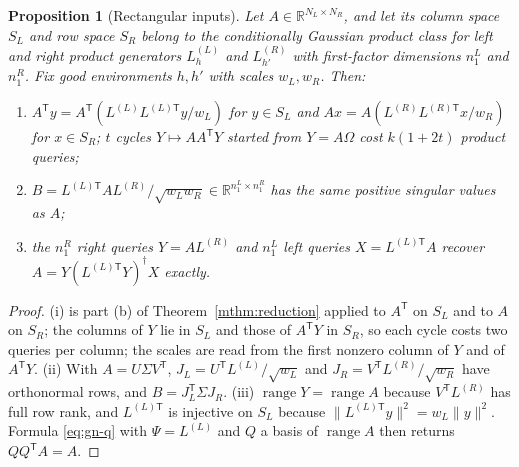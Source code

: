 \documentclass[11pt,a4paper]{article}
\newtheorem{proposition}[theorem]{Proposition}
\theoremstyle{definition}
\theoremstyle{remark}
\numberwithin{equation}{section}
\newcommand{\R}{\mathbb R}
\newcommand{\T}{{\mathsf T}}
\newcommand{\range}{\operatorname{range}}
\newcommand{\norm}[1]{\lVert#1\rVert}
\begin{document}
\begin{proposition}[Rectangular inputs]\label{prop:rect}
Let $A\in\R^{N_L\times N_R}$, and let its column space $S_L$ and row space
$S_R$ belong to the conditionally Gaussian product class for left and right
product generators $L^{(L)}_{h}$ and $L^{(R)}_{h'}$ with first-factor dimensions
$n_1^L$ and $n_1^R$. Fix good environments $h,h'$ with scales $w_L,w_R$. Then:
\begin{enumerate}[label=\textup{(\roman*)}]
\item $A^\T y=A^\T(L^{(L)}L^{(L)\T}y/w_L)$ for $y\in S_L$ and
      $Ax=A(L^{(R)}L^{(R)\T}x/w_R)$ for $x\in S_R$; $t$ cycles
      $Y\mapsto AA^\T Y$ started from $Y=A\Omega$ cost $k(1+2t)$ product queries;
\item $B=L^{(L)\T}AL^{(R)}/\sqrt{w_Lw_R}\in\R^{n_1^L\times n_1^R}$ has the same
      positive singular values as $A$;
\item the $n_1^R$ right queries $Y=AL^{(R)}$ and $n_1^L$ left queries
      $X=L^{(L)\T}A$ recover $A=Y(L^{(L)\T}Y)^\dagger X$ exactly.
\end{enumerate}
\end{proposition}

\begin{proof}
(i) is part (b) of Theorem~\ref{mthm:reduction} applied to $A^\T$ on $S_L$ and
to $A$ on $S_R$; the columns of $Y$ lie in $S_L$ and those of $A^\T Y$ in $S_R$,
so each cycle costs two queries per column; the scales are read from the
first nonzero column of $Y$ and of $A^\T Y$. (ii) With $A=U\Sigma V^\T$,
$J_L=U^\T L^{(L)}/\sqrt{w_L}$ and $J_R=V^\T L^{(R)}/\sqrt{w_R}$ have orthonormal
rows, and $B=J_L^\T\Sigma J_R$. (iii) $\range Y=\range A$ because
$V^\T L^{(R)}$ has full row rank, and $L^{(L)\T}$ is injective on $S_L$ because
$\norm{L^{(L)\T}y}^2=w_L\norm y^2$. Formula \eqref{eq:gn-q} with $\Psi=L^{(L)}$
and $Q$ a basis of $\range A$ then returns $QQ^\T A=A$.
\end{proof}
\end{document}
